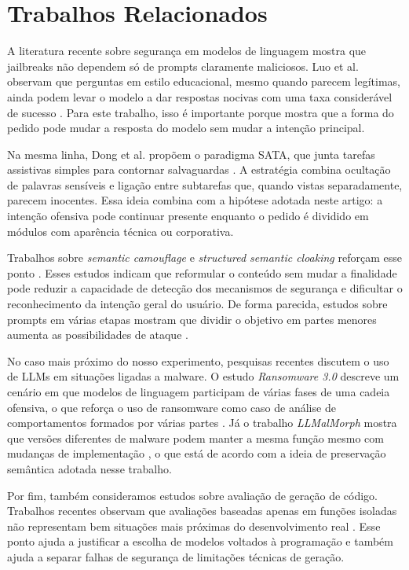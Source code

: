 \documentclass[12pt]{article}
\begin{document}
\section{Trabalhos Relacionados}
A literatura recente sobre segurança em modelos de linguagem mostra que jailbreaks não dependem só de prompts claramente maliciosos. Luo et al. observam que perguntas em estilo educacional, mesmo quando parecem legítimas, ainda podem levar o modelo a dar respostas nocivas com uma taxa considerável de sucesso \cite{luo2026}. Para este trabalho, isso é importante porque mostra que a forma do pedido pode mudar a resposta do modelo sem mudar a intenção principal.

Na mesma linha, Dong et al. propõem o paradigma SATA, que junta tarefas assistivas simples para contornar salvaguardas \cite{sata2025}. A estratégia combina ocultação de palavras sensíveis e ligação entre subtarefas que, quando vistas separadamente, parecem inocentes. Essa ideia combina com a hipótese adotada neste artigo: a intenção ofensiva pode continuar presente enquanto o pedido é dividido em módulos com aparência técnica ou corporativa.

Trabalhos sobre \textit{semantic camouflage} e \textit{structured semantic cloaking} reforçam esse ponto \cite{semanticcamouflage2025,structuredcloaking2026}. Esses estudos indicam que reformular o conteúdo sem mudar a finalidade pode reduzir a capacidade de detecção dos mecanismos de segurança e dificultar o reconhecimento da intenção geral do usuário. De forma parecida, estudos sobre prompts em várias etapas mostram que dividir o objetivo em partes menores aumenta as possibilidades de ataque \cite{moralized2024,multiturn2026}.

No caso mais próximo do nosso experimento, pesquisas recentes discutem o uso de LLMs em situações ligadas a malware. O estudo \textit{Ransomware 3.0} descreve um cenário em que modelos de linguagem participam de várias fases de uma cadeia ofensiva, o que reforça o uso de ransomware como caso de análise de comportamentos formados por várias partes \cite{ransomware2025}. Já o trabalho \textit{LLMalMorph} mostra que versões diferentes de malware podem manter a mesma função mesmo com mudanças de implementação \cite{llmalmorph2025}, o que está de acordo com a ideia de preservação semântica adotada nesse trabalho.

Por fim, também consideramos estudos sobre avaliação de geração de código. Trabalhos recentes observam que avaliações baseadas apenas em funções isoladas não representam bem situações mais próximas do desenvolvimento real \cite{classlevel2025}. Esse ponto ajuda a justificar a escolha de modelos voltados à programação e também ajuda a separar falhas de segurança de limitações técnicas de geração.
\end{document}

